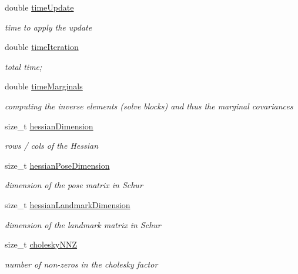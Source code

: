 \begin{DoxyCompactItemize}
double \hyperlink{structg2o_1_1G2OBatchStatistics_a510e287e5a3e1f608219147b53e6dc69}{time\+Update}
\begin{DoxyCompactList}\small\item\em time to apply the update \end{DoxyCompactList}\item 
double \hyperlink{structg2o_1_1G2OBatchStatistics_a60fbec94ce0b7f26ed99d3f6d2080e47}{time\+Iteration}
\begin{DoxyCompactList}\small\item\em total time; \end{DoxyCompactList}\item 
double \hyperlink{structg2o_1_1G2OBatchStatistics_a58e5d0960dc35e682424dce2b50e4fa9}{time\+Marginals}
\begin{DoxyCompactList}\small\item\em computing the inverse elements (solve blocks) and thus the marginal covariances \end{DoxyCompactList}\item 
size\+\_\+t \hyperlink{structg2o_1_1G2OBatchStatistics_a618a15ba153da1a99b19a2d779cf3764}{hessian\+Dimension}
\begin{DoxyCompactList}\small\item\em rows / cols of the Hessian \end{DoxyCompactList}\item 
size\+\_\+t \hyperlink{structg2o_1_1G2OBatchStatistics_ae2af64720e3f99557924b9cf92ab6f20}{hessian\+Pose\+Dimension}
\begin{DoxyCompactList}\small\item\em dimension of the pose matrix in Schur \end{DoxyCompactList}\item 
size\+\_\+t \hyperlink{structg2o_1_1G2OBatchStatistics_a0cfa7018402074f47defb9cd5d9d4b64}{hessian\+Landmark\+Dimension}
\begin{DoxyCompactList}\small\item\em dimension of the landmark matrix in Schur \end{DoxyCompactList}\item 
size\+\_\+t \hyperlink{structg2o_1_1G2OBatchStatistics_a5996c5ba000bdfcbcf5c0375a3c62643}{cholesky\+N\+NZ}
\begin{DoxyCompactList}\small\item\em number of non-\/zeros in the cholesky factor \end{DoxyCompactList}\end{DoxyCompactItemize}

